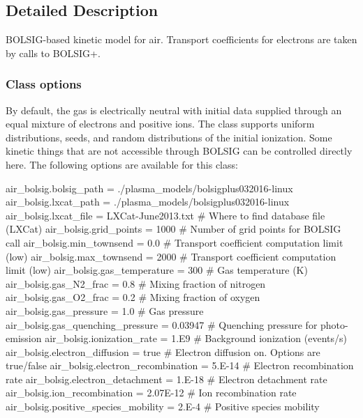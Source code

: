 \subsection{Detailed Description}
B\+O\+L\+S\+I\+G-\/based kinetic model for air. Transport coefficients for electrons are taken by calls to B\+O\+L\+S\+I\+G+. 

\subsubsection*{Class options }

By default, the gas is electrically neutral with initial data supplied through an equal mixture of electrons and positive ions. The class supports uniform distributions, seeds, and random distributions of the initial ionization. Some kinetic things that are not accessible through B\+O\+L\+S\+IG can be controlled directly here. The following options are available for this class\+: \begin{DoxyVerb}air_bolsig.bolsig_path                   = ./plasma_models/bolsigplus032016-linux
air_bolsig.lxcat_path                    = ./plasma_models/bolsigplus032016-linux
air_bolsig.lxcat_file                    = LXCat-June2013.txt    # Where to find database file (LXCat)
air_bolsig.grid_points                   = 1000                  # Number of grid points for BOLSIG call
air_bolsig.min_townsend                  = 0.0                   # Transport coefficient computation limit (low)
air_bolsig.max_townsend                  = 2000                  # Transport coefficient computation limit (low)
air_bolsig.gas_temperature               = 300                   # Gas temperature (K)
air_bolsig.gas_N2_frac                   = 0.8                   # Mixing fraction of nitrogen
air_bolsig.gas_O2_frac                   = 0.2                   # Mixing fraction of oxygen
air_bolsig.gas_pressure                  = 1.0                   # Gas pressure
air_bolsig.gas_quenching_pressure        = 0.03947               # Quenching pressure for photo-emission
air_bolsig.ionization_rate               = 1.E9                  # Background ionization (events/s)
air_bolsig.electron_diffusion            = true                  # Electron diffusion on. Options are true/false
air_bolsig.electron_recombination        = 5.E-14                # Electron recombination rate
air_bolsig.electron_detachment           = 1.E-18                # Electron detachment rate
air_bolsig.ion_recombination             = 2.07E-12              # Ion recombination rate
air_bolsig.positive_species_mobility     = 2.E-4                 # Positive species mobility

\end{DoxyVerb}
